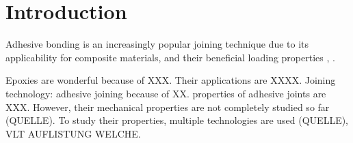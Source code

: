 \chapter{Introduction}\label{chap:introduction}

Adhesive bonding is an increasingly popular joining technique due to its applicability for composite materials, and their beneficial loading properties \cite{campilho_extended_2011}, \cite{pramanik_joining_2017}.

Epoxies are wonderful because of XXX. Their applications are XXXX. Joining technology: adhesive joining because of XX. properties of adhesive joints are XXX. However, their mechanical properties are not completely studied so far (QUELLE). To study their properties, multiple technologies are used (QUELLE), VLT AUFLISTUNG WELCHE. 

